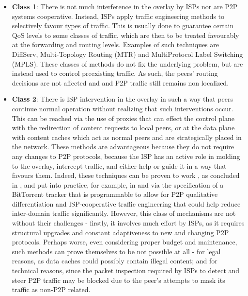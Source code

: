 \documentclass[
  oneside,
  11pt, a4paper,
  footinclude=true,
  headinclude=true,
  cleardoublepage=empty
]{scrbook}
\begin{document}
	\begin{itemize}
	    \item \textbf{Class 1}: There is not much interference in the overlay by ISPs nor are P2P systems cooperative. Instead, ISPs apply traffic engineering methods to selectively favour types of traffic. This is usually done to guarantee certain QoS levels to some classes of traffic, which are then to be treated favourably at the forwarding and routing levels. Examples of such techniques are DiffServ, Multi-Topology Routing (MTR) and MultiProtocol Label Switching (MPLS). These classes of methods do not fix the underlying problem, but are instead used to control preexisting traffic. As such, the peers' routing decisions are not affected and and P2P traffic still remains non localized.
	    \item \textbf{Class 2}: There is ISP intervention in the overlay in such a way that peers continue normal operation without realizing that such interventions occur. This can be reached via the use of proxies that can effect the control plane with the redirection of content requests to local peers, or at the data plane with content caches which act as normal peers and are strategically placed in the network. These methods are advantageous because they do not require any changes to P2P protocols, because the ISP has an active role in molding to the overlay, intercept traffic, and either help or guide it in a way that favours them. Indeed, these techniques can be proven to work , as concluded in \cite{dan-Commag10}, and put into practice, for example, in \cite{programmable-trackers} and \cite{configurable-trackers} via the specification of a BitTorrent tracker that is programmable to allow for P2P qualitative differentiation and ISP-cooperative traffic engineering that could help reduce inter-domain traffic significantly. However, this class of mechanisms are not without their challenges - firstly, it involves much effort by ISPs, as it requires structural upgrades and constant adaptiveness to new and changing P2P protocols. Perhaps worse, even considering proper budget and maintenance, such methods can prove themselves to be not possible at all - for legal reasons, as data caches could possibly contain illegal content; and for technical reasons, since the packet inspection required by ISPs to detect and steer P2P traffic may be blocked due to the peer's attempts to mask its traffic as non-P2P related.

\end{itemize}
\end{document}
